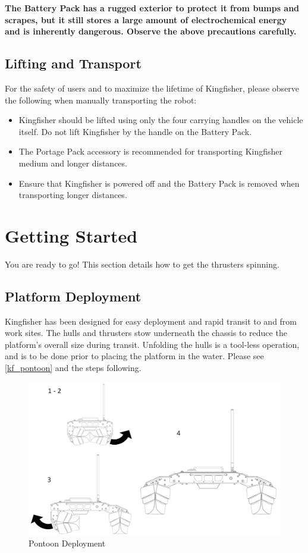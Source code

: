 \documentclass[]{clearpath-latex/clearpath-manual}
\begin{document}
\textbf{The Battery Pack has a rugged exterior to protect it from bumps and scrapes, but it still stores a large amount of electrochemical energy and is inherently dangerous. Observe the above precautions carefully.}

\subsection{Lifting and Transport}
For the safety of users and to maximize the lifetime of Kingfisher, please observe the following when manually transporting the robot:

\begin{itemize}[nolistsep]
	\item Kingfisher should be lifted using only the four carrying handles on the vehicle itself. Do not lift Kingfisher by the handle on the Battery Pack.
	\item The Portage Pack accessory is recommended for transporting Kingfisher medium and longer distances.
	\item Ensure that Kingfisher is powered off and the Battery Pack is removed when transporting longer distances.
\end{itemize}

\newpage

\section{Getting Started} \label{gettingstarted}
You are ready to go! This section details how to get the thrusters spinning.

\subsection{Platform Deployment}
Kingfisher has been designed for easy deployment and rapid transit to and from work sites. The hulls and thrusters stow underneath the chassis to reduce the platform's overall size during transit. Unfolding the hulls is a tool-less operation, and is to be done prior to placing the platform in the water. Please see \autoref{kf_pontoon} and the steps following.

\begin{figure}[h]
  \centering
  \includegraphics[width=0.75\linewidth]{kf_pontoon.PNG}
  \caption{Pontoon Deployment}
  \label{kf_pontoon}
\end{figure}
\end{document}
